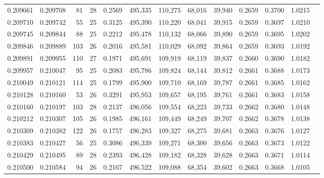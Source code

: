 \begin{tabular}{rrrrrrrrrrrrr}
0.209661 & 0.209708 &  81 &  28 &                                     0.2569 & 495,335 & 110,275 &  68,016 &  39,940 & 0.2659 & 0.3700 & 1.0215 \\
0.209710 & 0.209742 &  55 &  25 &                                     0.3125 & 495,390 & 110,220 &  68,041 &  39,915 & 0.2659 & 0.3697 & 1.0210 \\
0.209745 & 0.209844 &  88 &  25 &                                     0.2212 & 495,478 & 110,132 &  68,066 &  39,890 & 0.2659 & 0.3695 & 1.0202 \\
0.209846 & 0.209889 & 103 &  26 &                                     0.2016 & 495,581 & 110,029 &  68,092 &  39,864 & 0.2659 & 0.3693 & 1.0192 \\
0.209891 & 0.209955 & 110 &  27 &                                     0.1971 & 495,691 & 109,919 &  68,119 &  39,837 & 0.2660 & 0.3690 & 1.0182 \\
0.209957 & 0.210047 &  95 &  25 &                                     0.2083 & 495,786 & 109,824 &  68,144 &  39,812 & 0.2661 & 0.3688 & 1.0173 \\
0.210049 & 0.210121 & 114 &  25 &                                     0.1799 & 495,900 & 109,710 &  68,169 &  39,787 & 0.2661 & 0.3685 & 1.0162 \\
0.210128 & 0.210160 &  53 &  26 &                                     0.3291 & 495,953 & 109,657 &  68,195 &  39,761 & 0.2661 & 0.3683 & 1.0158 \\
0.210160 & 0.210197 & 103 &  28 &                                     0.2137 & 496,056 & 109,554 &  68,223 &  39,733 & 0.2662 & 0.3680 & 1.0148 \\
0.210212 & 0.210307 & 105 &  26 &                                     0.1985 & 496,161 & 109,449 &  68,249 &  39,707 & 0.2662 & 0.3678 & 1.0138 \\
0.210309 & 0.210382 & 122 &  26 &                                     0.1757 & 496,283 & 109,327 &  68,275 &  39,681 & 0.2663 & 0.3676 & 1.0127 \\
0.210383 & 0.210427 &  56 &  25 &                                     0.3086 & 496,339 & 109,271 &  68,300 &  39,656 & 0.2663 & 0.3673 & 1.0122 \\
0.210429 & 0.210495 &  89 &  28 &                                     0.2393 & 496,428 & 109,182 &  68,328 &  39,628 & 0.2663 & 0.3671 & 1.0114 \\
0.210500 & 0.210584 &  94 &  26 &                                     0.2167 & 496,522 & 109,088 &  68,354 &  39,602 & 0.2663 & 0.3668 & 1.0105 \\

\end{tabular}
